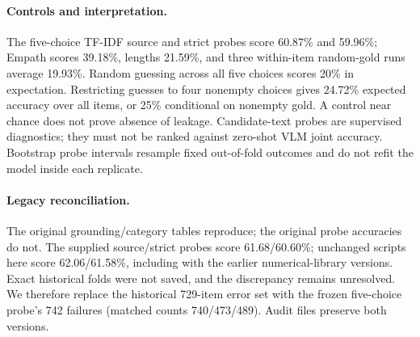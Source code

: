 \paragraph{Controls and interpretation.} The five-choice TF-IDF source and strict probes score 60.87\% and 59.96\%; Empath scores 39.18\%, lengths 21.59\%, and three within-item random-gold runs average 19.93\%. Random guessing across all five choices scores 20\% in expectation. Restricting guesses to four nonempty choices gives 24.72\% expected accuracy over all items, or 25\% conditional on nonempty gold. A control near chance does not prove absence of leakage. Candidate-text probes are supervised diagnostics; they must not be ranked against zero-shot VLM joint accuracy. Bootstrap probe intervals resample fixed out-of-fold outcomes and do not refit the model inside each replicate.

\paragraph{Legacy reconciliation.} The original grounding/category tables reproduce; the original probe accuracies do not. The supplied source/strict probes score 61.68/60.60\%; unchanged scripts here score 62.06/61.58\%, including with the earlier numerical-library versions. Exact historical folds were not saved, and the discrepancy remains unresolved. We therefore replace the historical 729-item error set with the frozen five-choice probe's 742 failures (matched counts 740/473/489). Audit files preserve both versions.
